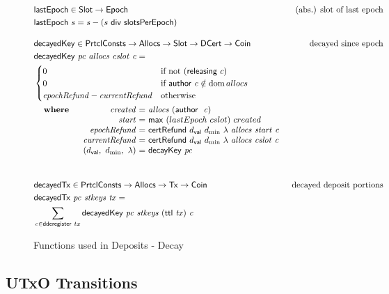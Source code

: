 \documentclass[11pt,a4paper,dvipsnames]{article}
\newcommand{\Tx}{\type{Tx}}
\newcommand{\Coin}{\type{Coin}}
\newcommand{\PrtclConsts}{\type{PrtclConsts}}
\newcommand{\Slot}{\type{Slot}}
\newcommand{\Allocs}{\type{Allocs}}
\newcommand{\DCert}{\type{DCert}}
\newcommand{\Epoch}{\type{Epoch}}
\newcommand{\ttl}[1]{\fun{ttl}~ \var{#1}}
\newcommand{\decayedKey}[4]{\fun{decayedKey}~ \var{#1}~ \var{#2}~ \var{#3}~ \var{#4}}
\newcommand{\decayedTx}[3]{\fun{decayedTx}~ \var{#1}~ \var{#2}~ \var{#3}}
\newcommand{\certRefund}[6]{\fun{certRefund}~ {#1}~{#2}~{#3}~\var{#4}~\var{#5}~\var{#6}}
\newcommand{\cauthor}[1]{\fun{author}~ \var{#1}}
\newcommand{\dval}{\ensuremath{d_{\mathsf{val}}}}
\newcommand{\slotsPer}{\ensuremath{\mathsf{slotsPerEpoch}}}
\theoremstyle{definition}
\theoremstyle{definition}
\begin{document}
\begin{figure}
  \begin{align*}
      & \fun{lastEpoch} \in \Slot \to \Epoch
      & \text{(abs.) slot of last epoch} \\
      & \fun{lastEpoch}~{s} =  s - (s~\mathsf{div}~\slotsPer)
      \nextdef
      & \fun{decayedKey} \in
      \PrtclConsts \to \Allocs \to \Slot \to \DCert \to \Coin
      & \text{decayed since epoch} \\
      & \decayedKey{pc}{allocs}{cslot}{c} =\\
      & \begin{cases}
        0 & \text{if not}~(\fun{releasing}~c)\\
            0 & \text{if}~\cauthor c \notin \dom allocs\\
            \var{epochRefund} - \var{currentRefund}
            & \text{otherwise}
        \end{cases}\\
      &
      \begin{array}{lr@{~=~}l}
        \where
          & \var{created} & \var{allocs}~(\cauthor~\var{c}) \\
          & \var{start} & \mathsf{max}~(lastEpoch~cslot)~created \\
          & \var{epochRefund} & \certRefund{\dval}{d_{\min}}{\lambda}{allocs}{start}{c} \\
          & \var{currentRefund} & \certRefund{\dval}{d_{\min}}{\lambda}{allocs}{cslot}{c} \\
          & (\dval,~d_{\min},~\lambda) & \fun{decayKey}~\var{pc}\\
      \end{array}\\
      \nextdef
      & \fun{decayedTx} \in \PrtclConsts \to \Allocs \to \Tx \to \Coin
      & \text{decayed deposit portions} \\
      & \decayedTx{pc}{stkeys}{tx} =\\
      &   \sum\limits_{c \in \fun{dderegister}~tx} \decayedKey{pc}{stkeys}{(\ttl{tx})}{c}\\
  \end{align*}
  \caption{Functions used in Deposits - Decay}
  \label{fig:functions:deposits-decay}
\end{figure}

\clearpage

\subsection{UTxO Transitions}
\label{sec:state-trans-utxo-1}
\end{document}
